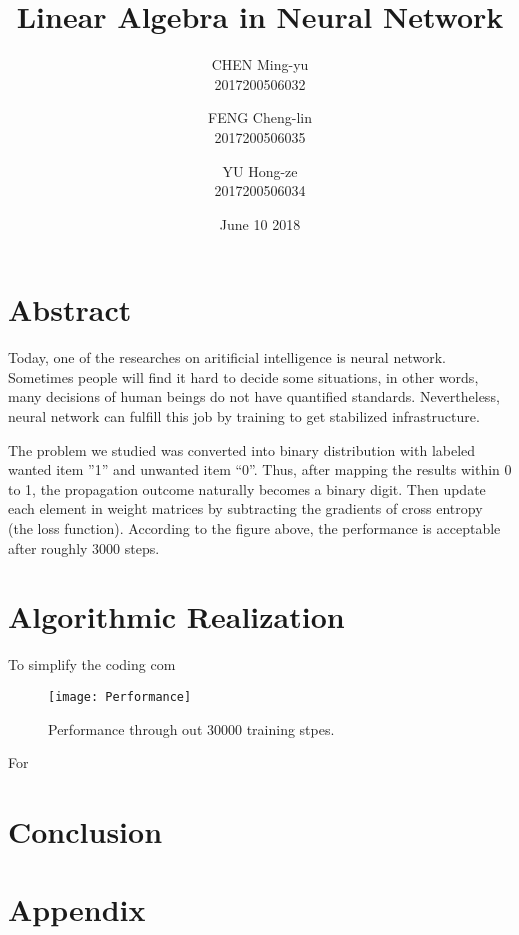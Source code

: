 \documentclass{article}
\title{Linear Algebra in Neural Network}
\author{CHEN Ming-yu\\2017200506032\\
    \and FENG Cheng-lin\\2017200506035\\
    \and YU Hong-ze\\2017200506034\\}
\date{June 10 2018}
\begin{document}
    \maketitle
    \begin{spacing}{2}
    \linespread{2}
    \section{Abstract}
    Today, one of the researches on aritificial intelligence is neural network. Sometimes people will find it hard to decide some situations, in other words, many decisions of human beings do not have quantified standards. Nevertheless, neural network can fulfill this job by training to get stabilized infrastructure.


    \noindent The problem we studied was converted into binary distribution with labeled wanted item ”1” and unwanted item “0”. Thus, after mapping the results within 0 to 1, the propagation outcome naturally becomes a binary digit. Then update each element in weight matrices by subtracting the gradients of cross entropy (the loss function). According to the figure above, the performance is acceptable after roughly 3000 steps.
    
    \section{Algorithmic Realization}

    To simplify the coding com
    \begin{figure}[H]
        \centering 
        \texttt{[image: Performance]}
        \caption{Performance through out 30000 training stpes.}
        \end{figure}
  
    \noindent For
    

    \section{Conclusion}
 

    \section{Appendix}

  

   

    
    
    \begin{thebibliography}{10}
   

    \end{thebibliography}

    \end{spacing}
    
\end{document}
